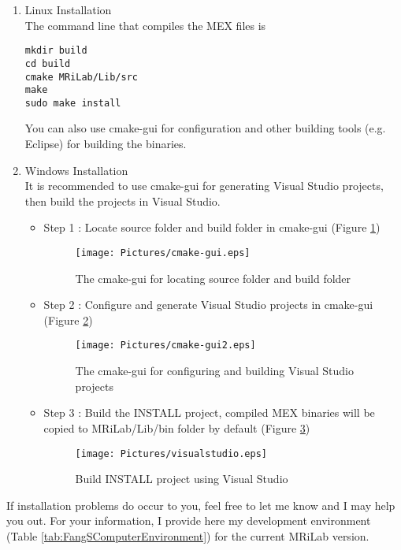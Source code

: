\documentclass{book}%
\begin{document}
\begin{enumerate}
\item Linux Installation \\
The command line that compiles the MEX files is 
\begin{verbatim}
mkdir build
cd build
cmake MRiLab/Lib/src
make
sudo make install
\end{verbatim}

You can also use cmake-gui for configuration and other building tools (e.g. Eclipse) for building the binaries.

\item Windows Installation \\
It is recommended to use cmake-gui for generating Visual Studio projects, then build the projects in Visual Studio.

\begin{itemize}
	\item Step 1 : Locate source folder and build folder in cmake-gui (Figure \ref{fig:cmake-gui})
		\begin{figure}[htbp]
			\centering
				\texttt{[image: Pictures/cmake-gui.eps]}
			\caption{The cmake-gui for locating source folder and build folder}
			\label{fig:cmake-gui}
		\end{figure}
	\item Step 2 : Configure and generate Visual Studio projects in cmake-gui (Figure \ref{fig:cmake-gui2})
		\begin{figure}[htbp]
			\centering
				\texttt{[image: Pictures/cmake-gui2.eps]}
			\caption{The cmake-gui for configuring and building Visual Studio projects}
			\label{fig:cmake-gui2}
		\end{figure}
	\item Step 3 : Build the INSTALL project, compiled MEX binaries will be copied to MRiLab/Lib/bin folder by default (Figure \ref{fig:visualstudio})
		\begin{figure}[htbp]
			\centering
				\texttt{[image: Pictures/visualstudio.eps]}
			\caption{Build INSTALL project using Visual Studio}
			\label{fig:visualstudio}
		\end{figure}
	
\end{itemize}

\end{enumerate}

If installation problems do occur to you, feel free to let me know and I may help you out. For your information, I provide here my development environment (Table \ref {tab:FangSComputerEnvironment}) for the current MRiLab version.
\end{document}
